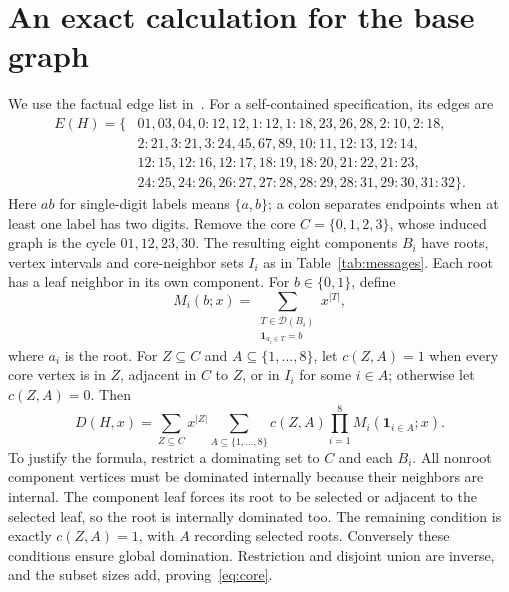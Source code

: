 \documentclass[11pt]{article}
\newcommand{\Dom}{\mathcal D}
\newcommand{\base}{H}
\begin{document}
\section{An exact calculation for the base graph}\label{sec:base}
We use the factual edge list in~\cite[Section 2]{AG}.
For a self-contained specification, its edges are
\begin{align*}
E(\base)=\{&01,03,04,0\!:\!12,12,1\!:\!12,1\!:\!18,23,26,28,2\!:\!10,2\!:\!18,\\
&2\!:\!21,3\!:\!21,3\!:\!24,45,67,89,10\!:\!11,12\!:\!13,12\!:\!14,\\
&12\!:\!15,12\!:\!16,12\!:\!17,18\!:\!19,18\!:\!20,21\!:\!22,21\!:\!23,\\
&24\!:\!25,24\!:\!26,26\!:\!27,27\!:\!28,28\!:\!29,28\!:\!31,29\!:\!30,31\!:\!32\}.
\end{align*}
Here $ab$ for single-digit labels means $\{a,b\}$; a colon separates
endpoints when at least one label has two digits.
Remove the core $C=\{0,1,2,3\}$, whose induced graph is the cycle
$01,12,23,30$. The resulting eight components $B_i$ have roots,
vertex intervals and core-neighbor sets $I_i$ as in Table~\ref{tab:messages}.
Each root has a leaf neighbor in its own component.
For $b\in\{0,1\}$, define
\[
 M_i(b;x)=\sum_{\substack{T\in\Dom(B_i)\\\boldsymbol1_{a_i\in T}=b}}x^{|T|},
\]
where $a_i$ is the root. For $Z\subseteq C$ and
$A\subseteq\{1,\ldots,8\}$, let $c(Z,A)=1$ when every core vertex is
in $Z$, adjacent in $C$ to $Z$, or in $I_i$ for some $i\in A$;
otherwise let $c(Z,A)=0$. Then
\begin{equation}\label{eq:core}
 D(\base,x)=\sum_{Z\subseteq C}x^{|Z|}
       \sum_{A\subseteq\{1,\ldots,8\}}c(Z,A)
            \prod_{i=1}^8 M_i(\boldsymbol1_{i\in A};x).
\end{equation}
To justify the formula, restrict a dominating set to $C$ and each $B_i$.
All nonroot component vertices must be dominated internally because
their neighbors are internal. The component leaf forces its root to be
selected or adjacent to the selected leaf, so the root is internally
dominated too. The remaining condition is exactly $c(Z,A)=1$, with
$A$ recording selected roots. Conversely these conditions ensure
global domination. Restriction and disjoint union are inverse, and
the subset sizes add, proving~\eqref{eq:core}.
\end{document}
